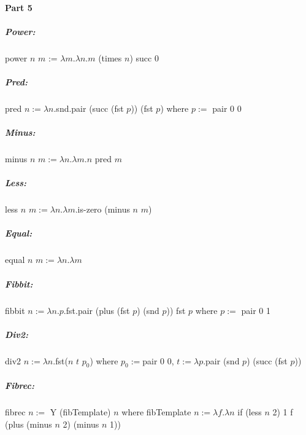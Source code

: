 \documentclass[12pt]{article}
\begin{document}
\paragraph{Part 5}
\subparagraph{Power:}
\raggedright

power $n$ $m$ := $\lambda m. \lambda n.m$ (times $n$) succ 0
\subparagraph{Pred:}
pred $n:= \lambda n$.snd.pair (succ (fst $p$)) (fst $p$) where $p := $ pair 0 0
\subparagraph{Minus:} 
minus $n$ $m := \lambda n. \lambda m.n$ pred $m$
\subparagraph{Less:}
less $n$ $m := \lambda n. \lambda m.$is-zero (minus $n$ $m$)
\subparagraph{Equal:}
equal $n$ $m := \lambda n. \lambda m$
\subparagraph{Fibbit:}
fibbit $n := \lambda n.p.$fst.pair (plus (fst $p$) (snd $p$)) fst $p$ where $p := $ pair 0 1
\subparagraph{Div2:}
div2 $n := \lambda n.$fst($n$ $t$ $p_{0}$) where $p_{0} := $pair 0 0, $t := \lambda p.$pair (snd $p$) (succ (fst $p$))
\subparagraph{Fibrec:}
fibrec $n :=$ Y (fibTemplate) $n$ where fibTemplate $n := \lambda f.\lambda n$ if (less $n$ 2) 1 f (plus (minus $n$ 2) (minus $n$ 1))
\enddocument
\end{document}
